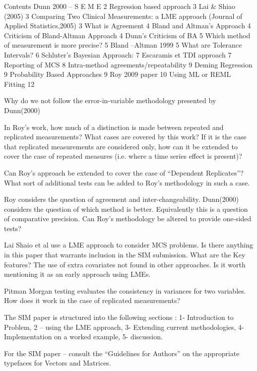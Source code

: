 Contents
Dunn 2000 – S E M E	2
Regression based approach	3
Lai & Shiao (2005)	3
Comparing Two Clinical Measurements: a LME approach (Journal of Applied Statistics,2005)	3
What is Agreement	4
Bland  and Altman’s Approach	4
Criticism of Bland-Altman Approach	4
Dunn’s Criticism of BA	5
Which method of measurement is more precise?	5
Bland –Altman 1999	5
What are Tolerance Intervals?	6
Schluter’s Bayesian Approach:	7
Escaramis et TDI approach	7
Reporting of MCS	8
Intra-method agreements/repeatability	9
Deming Regression	9
Probability Based Approaches	9
Roy 2009 paper	10
Using ML or REML Fitting	12



Why do we not follow the error-in-variable methodology presented by Dunn(2000)

In Roy’s work, how much of a distinction is made between repeated and replicated measurements? What cases are covered by this work? If it is the case that replicated measurements are considered only, how can it be extended to cover the case of repeated measures (i.e. where a time series effect is present)?

Can Roy’s approach be extended to cover the case of “Dependent Replicates”? What sort of additional tests can be added to Roy’s methodology in such a case.

Roy considers the question of agreement and inter-changeability. Dunn(2000) considers the question of which method is better. Equivalently this is a question of comparative precision. Can Roy’s methodology be altered to provide one-sided tests?

Lai  Shaio et al use a LME approach to consider MCS problems. Is there anything in this paper that warrants inclusion in the SIM submission. 
What are the Key features? The use of extra covariates not found in other approaches.  Is it worth mentioning it as an early approach using LMEs.

Pitman Morgan testing evaluates the consistency in variances for two variables. How does it work in the case of replicated measurements?

The SIM paper is structured into the following sections : 1- Introduction to Problem, 2 – using the LME approach, 3- Extending current methodologies, 4- Implementation on a worked example, 5- discussion.

For the SIM paper – consult the “Guidelines for Authors” on the appropriate typefaces for Vectors and Matrices.



